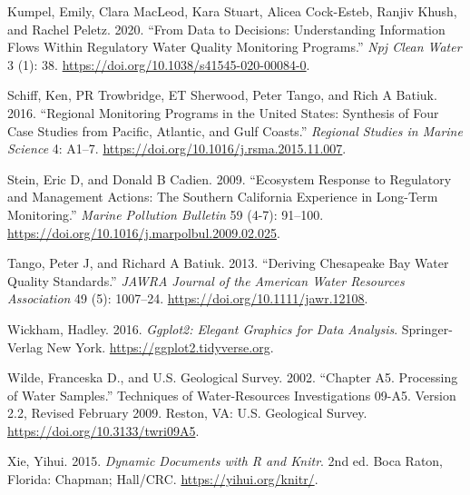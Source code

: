 \begin{CSLReferences}{1}{0}
\leavevmode{}%
Kumpel, Emily, Clara MacLeod, Kara Stuart, Alicea Cock-Esteb, Ranjiv Khush, and Rachel Peletz. 2020. {``From Data to Decisions: Understanding Information Flows Within Regulatory Water Quality Monitoring Programs.''} \emph{Npj Clean Water} 3 (1): 38. \url{https://doi.org/10.1038/s41545-020-00084-0}.

\leavevmode{}%
Schiff, Ken, PR Trowbridge, ET Sherwood, Peter Tango, and Rich A Batiuk. 2016. {``Regional Monitoring Programs in the United States: Synthesis of Four Case Studies from Pacific, Atlantic, and Gulf Coasts.''} \emph{Regional Studies in Marine Science} 4: A1--7. \url{https://doi.org/10.1016/j.rsma.2015.11.007}.

\leavevmode{}%
Stein, Eric D, and Donald B Cadien. 2009. {``Ecosystem Response to Regulatory and Management Actions: The Southern California Experience in Long-Term Monitoring.''} \emph{Marine Pollution Bulletin} 59 (4-7): 91--100. \url{https://doi.org/10.1016/j.marpolbul.2009.02.025}.

\leavevmode{}%
Tango, Peter J, and Richard A Batiuk. 2013. {``Deriving {C}hesapeake {B}ay Water Quality Standards.''} \emph{JAWRA Journal of the American Water Resources Association} 49 (5): 1007--24. \url{https://doi.org/10.1111/jawr.12108}.

\leavevmode{}%
Wickham, Hadley. 2016. \emph{Ggplot2: Elegant Graphics for Data Analysis}. Springer-Verlag New York. \url{https://ggplot2.tidyverse.org}.

\leavevmode{}%
Wilde, Franceska D., and U.S. Geological Survey. 2002. {``Chapter A5. Processing of Water Samples.''} Techniques of Water-Resources Investigations 09-A5. Version 2.2, Revised February 2009. Reston, VA: U.S. Geological Survey. \url{https://doi.org/10.3133/twri09A5}.

\leavevmode{}%
Xie, Yihui. 2015. \emph{Dynamic Documents with {R} and Knitr}. 2nd ed. Boca Raton, Florida: Chapman; Hall/CRC. \url{https://yihui.org/knitr/}.

\end{CSLReferences}



\address{%
Marcus W. Beck\\
Tampa Bay Estuary Program\\%
263 13th Ave S\\ St.~Petersburg, Florida, USA 33701\\
%
\url{https://tbep.org}\\%
\textit{ORCiD: \href{https://orcid.org/0000-0002-4996-0059}{0000-0002-4996-0059}}\\%
\href{mailto:mbeck@tbep.org}{\nolinkurl{mbeck@tbep.org}}%
}

